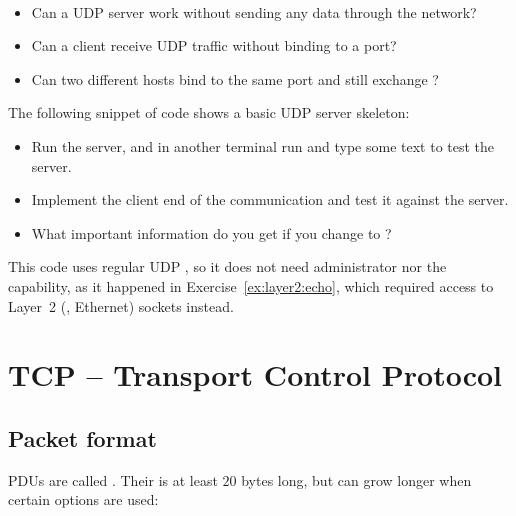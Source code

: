 \begin{exercise}\ \\[-0.5cm]
\begin{itemize}
\item Can a UDP server work without sending any data through the network?
\item Can a client receive UDP traffic without binding to a port?
\item Can two different hosts bind to the same port and still exchange ?
\end{itemize}
\end{exercise}


\begin{exercise}
The following snippet of code shows a basic UDP server skeleton:

\begin{center}
\end{center}

\begin{itemize}
\item Run the server, and in another terminal run  and type some text to test 
  the server.
\item Implement the client end of the communication and test it against the server.
\item What important information do you get if you change  to ?
\end{itemize}

\begin{remark}
This code uses regular UDP , so it does not need administrator 
nor the  capability, as it happened in Exercise~\ref{ex:layer2:echo},
which required access to Layer~2 (\eg, Ethernet) sockets instead.
\end{remark}
\end{exercise}

\section{TCP -- Transport Control Protocol}
\subsection{Packet format}

 PDUs are called . 
Their  is at least $20$ bytes long, but can grow longer when certain options are used:

